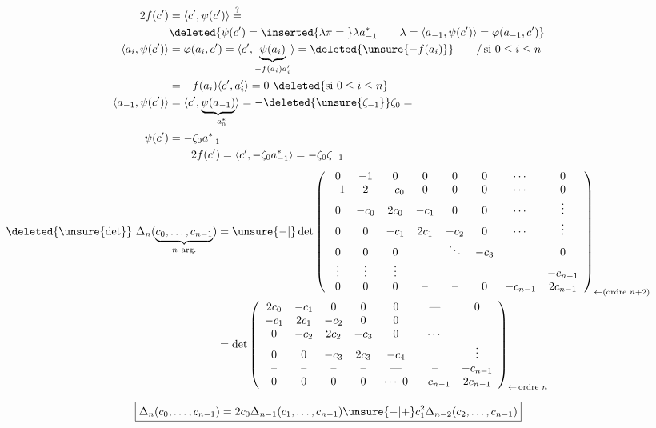 \[
\begin{aligned}
2f(c')&=\langle c',\psi(c')\rangle\overset{?}{=}\\
&\deleted{\psi(c')=\inserted{\lambda\pi={}}\lambda a_{-1}^*\qquad\lambda=\langle a_{-1},\psi(c')\rangle=\varphi(a_{-1},c')}\\
\langle a_i,\psi(c')\rangle&=\varphi(a_i,c')=\langle c',\underbrace{\psi(a_i)}_{-f(a_i)a'_i}\rangle
=\deleted{\unsure{-f(a_i)}}\qquad/\,\text{si }0\le i\le n\\
&=-f(a_i)\langle c',a'_i\rangle=0\ \deleted{\text{si }0\le i\le n}\\
\langle a_{-1},\psi(c')\rangle&=\langle c',\underbrace{\psi(a_{-1})}_{-a_0^*}\rangle=-\deleted{\unsure{\zeta_{-1}}}\zeta_0=\\
\psi(c')&=-\zeta_0 a_{-1}^*\\
&\qquad 2f(c')=\langle c',-\zeta_0a_{-1}^*\rangle=-\zeta_0\zeta_{-1}
\end{aligned}
\]
\[
\begin{aligned}
\deleted{\unsure{\det}}\ \Delta_n(\underbrace{c_0,\ldots,c_{n-1}}_{n\ \text{arg.}})
&=\unsure{-|{}}\det\left(\begin{array}{cccccccc}
0&-1&0&0&0&0&\cdots&0\\
-1&2&-c_0&0&0&0&\cdots&0\\
0&-c_0&2c_0&-c_1&0&0&\cdots&\vdots\\
0&0&-c_1&2c_1&-c_2&0&\cdots&\vdots\\
0&0&0&&\ddots&-c_3&&0\\
\vdots&\vdots&\vdots&&&&&-c_{n-1}\\
0&0&0&\text{--}&\text{--}&0&-c_{n-1}&2c_{n-1}
\end{array}\right)_{\leftarrow(\text{ordre }n+2)}\\
&=\det\left(\begin{array}{ccccccc}
2c_0&-c_1&0&0&0&\text{---}&0\\
-c_1&2c_1&-c_2&0&0&&\\
0&-c_2&2c_2&-c_3&0&\cdots&\\
0&0&-c_3&2c_3&-c_4&&\vdots\\
\text{--}&\text{--}&\text{--}&\text{--}&\text{---}&\text{--}&-c_{n-1}\\
0&0&0&0&\cdots\ 0&-c_{n-1}&2c_{n-1}
\end{array}\right)_{\leftarrow\,\text{ordre }n}
\end{aligned}
\]

\[
\boxed{\Delta_n(c_0,\ldots,c_{n-1})=2c_0\Delta_{n-1}(c_1,\ldots,c_{n-1})\unsure{-|+}c_1^2\Delta_{n-2}(c_2,\ldots,c_{n-1})}
\]

